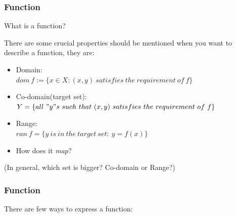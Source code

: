 \documentclass[12pt, t]{beamer}
\renewcommand{\emph}[1]{{\color{Turquoise3}\textsl{#1}}}
\begin{document}
\begin{frame}
    \frametitle{Function}
    \begin{center}
        What is a function?\\
    \end{center}
    There are some crucial properties should be mentioned when you want to describe a function, they are:
    \begin{itemize}
        \item Domain:\\
              $dom\ f:=\{x\in X: (x,y)\ satisfies\ the\ requirement\ of\ f\}$
        \item Co-domain(target set): \\
              $Y=\{all\ "y"s\ such\ that\ (x,y)\ satisfies\ the\ requirement\ of\ f\}$
        \item Range:\\
              $ran\ f=\{y\ is\ in\ the\ target\ set:\ y=f(x)\}$
        \item How does it \emph{map}?
    \end{itemize}
    (In general, which set is bigger? Co-domain or Range?)
\end{frame}

\begin{frame}
    \frametitle{Function}
    There are few ways to express a function:
    \vspace{2em}
    \begin{table}
        \centering
    \end{table}
\end{frame}
\end{document}

